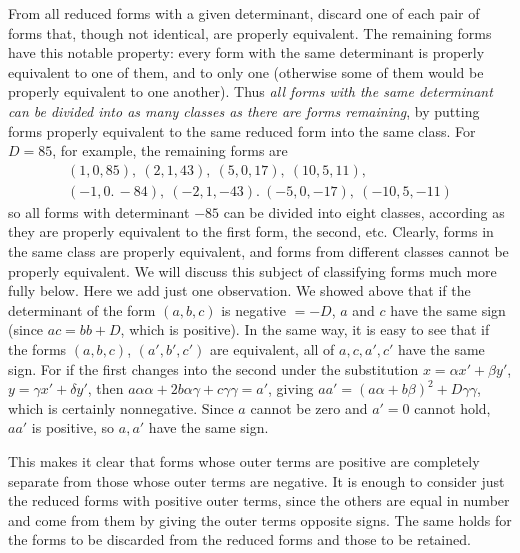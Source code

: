 From all reduced forms with a given determinant, discard one of each pair of forms that, though not identical, are properly equivalent. The remaining forms have this notable property: every form with the same determinant is properly equivalent to one of them, and to only one (otherwise some of them would be properly equivalent to one another). Thus \emph{all forms with the same determinant can be divided into as many classes as there are forms remaining}, by putting forms properly equivalent to the same reduced form into the same class. For $D=85$, for example, the remaining forms are
\[
\begin{gathered}
(1,0,85),\ (2,1,43),\ (5,0,17),\ (10,5,11),\\
(-1,0.\,-84),\ (-2,1,-43).\ (-5,0,-17),\ (-10,5,-11)
\end{gathered}
\]
so all forms with determinant $-85$ can be divided into eight classes, according as they are properly equivalent to the first form, the second, etc. Clearly, forms in the same class are properly equivalent, and forms from different classes cannot be properly equivalent. We will discuss this subject of classifying forms much more fully below. Here we add just one observation. We showed above that if the determinant of the form $(a,b,c)$ is negative $=-D$, $a$ and $c$ have the same sign (since $ac=bb+D$, which is positive). In the same way, it is easy to see that if the forms $(a,b,c)$, $(a',b',c')$ are equivalent, all of $a,c,a',c'$ have the same sign. For if the first changes into the second under the substitution $x=\alpha x'+\beta y'$, $y=\gamma x'+\delta y'$, then $a\alpha\alpha+2b\alpha\gamma+c\gamma\gamma=a'$, giving $aa'=(a\alpha+b\beta)^2+D\gamma\gamma$, which is certainly nonnegative. Since $a$ cannot be zero and $a'=0$ cannot hold, $aa'$ is positive, so $a,a'$ have the same sign.

This makes it clear that forms whose outer terms are positive are completely separate from those whose outer terms are negative. It is enough to consider just the reduced forms with positive outer terms, since
the others are equal in number and come from them by giving the outer terms opposite signs. The same holds for the forms to be discarded from the reduced forms and those to be retained.

